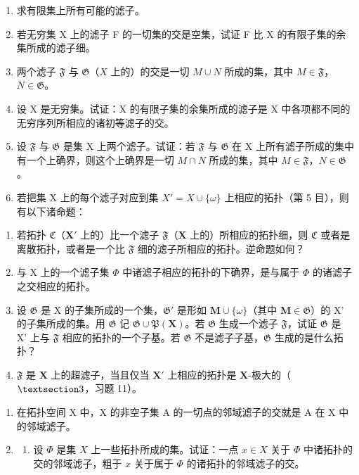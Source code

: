 \BourbakiExerciseGroup

\begin{enumerate}
\def\labelenumi{\arabic{enumi})}
\item
  求有限集上所有可能的滤子。
\item
  若无穷集 X 上的滤子 F 的一切集的交是空集，试证 F 比 X 的有限子集的余集所成的滤子细。
\item
  两个滤子 \(\mathfrak{F}\) 与 \(\mathfrak{G}\)（\(X\) 上的）的交是一切 \(M \cup N\) 所成的集，其中 \(M \in \mathfrak{F}\)，\(N \in \mathfrak{G}\)。
\item
  设 X 是无穷集。试证：X 的有限子集的余集所成的滤子是 X 中各项都不同的无穷序列所相应的诸初等滤子的交。
\item
  设 \(\mathfrak{F}\) 与 \(\mathfrak{G}\) 是集 X 上两个滤子。试证：若 \(\mathfrak{F}\) 与 \(\mathfrak{G}\) 在 X 上所有滤子所成的集中有一个上确界，则这个上确界是一切 \(M \cap N\) 所成的集，其中 \(M \in \mathfrak{F}\)，\(N \in \mathfrak{G}\)。
\item
  若把集 X 上的每个滤子对应到集 \(X' = X \cup \{\omega\}\) 上相应的拓扑（第 5 目），则有以下诸命题：
\end{enumerate}

\begin{enumerate}
\def\labelenumi{\alph{enumi})}
\item
  若拓扑 \(\mathfrak{C}\)（\(\mathbf{X}'\) 上的）比一个滤子 \(\mathfrak{F}\)（\(\mathbf{X}\) 上的）所相应的拓扑细，则 \(\mathfrak{C}\) 或者是离散拓扑，或者是一个比 \(\mathfrak{F}\) 细的滤子所相应的拓扑。逆命题如何？
\item
  与 X 上的一个滤子集 \(\Phi\) 中诸滤子相应的拓扑的下确界，是与属于 \(\Phi\) 的诸滤子之交相应的拓扑。
\item
  设 \(\mathfrak{G}\) 是 X 的子集所成的一个集，\(\mathfrak{G}'\) 是形如 \(\mathbf{M} \cup \{\omega\}\)（其中 \(\mathbf{M} \in \mathfrak{G}\)）的 X' 的子集所成的集。用 \(\mathfrak{G}\) 记 \(\mathfrak{G} \cup \mathfrak{P}(\mathbf{X})\)。若 \(\mathfrak{G}\) 生成一个滤子 \(\mathfrak{F}\)，试证 \(\mathfrak{G}\) 是 X' 上与 \(\mathfrak{F}\) 相应的拓扑的一个子基。若 \(\mathfrak{G}\) 不是滤子子基，\(\mathfrak{G}\) 生成的是什么拓扑？
\item
  \(\mathfrak{F}\) 是 \(\mathbf{X}\) 上的超滤子，当且仅当 \(\mathbf{X}'\) 上相应的拓扑是 \(\mathbf{X}\)-极大的（\(\S 3\)，习题 11）。
\end{enumerate}

\begin{enumerate}
\def\labelenumi{\arabic{enumi})}
\setcounter{enumi}{6}
\item
  在拓扑空间 X 中，X 的非空子集 A 的一切点的邻域滤子的交就是 A 在 X 中的邻域滤子。
\item
  \begin{enumerate}
  \def\labelenumii{\alph{enumii})}
  \tightlist
  \item
    设 \(\Phi\) 是集 \(X\) 上一些拓扑所成的集。试证：一点 \(x \in X\) 关于 \(\Phi\) 中诸拓扑的交的邻域滤子，粗于 \(x\) 关于属于 \(\Phi\) 的诸拓扑的邻域滤子的交。
  \end{enumerate}
\end{enumerate}

